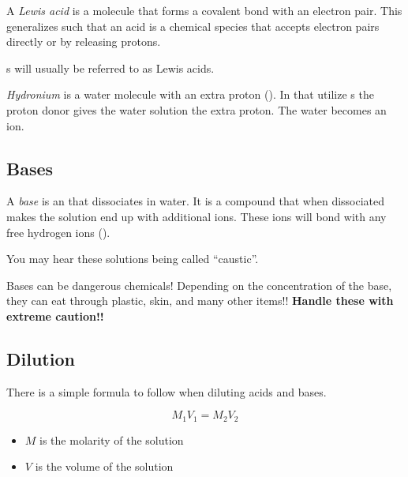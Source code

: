 \begin{definition} \label{def:Lewis Acid}
  A \emph{Lewis acid} is a molecule that forms a covalent bond with an electron pair.
  This generalizes such that an acid is a chemical species that accepts electron pairs directly or by releasing protons.
  
  \begin{remark}
    s will usually be referred to as Lewis acids.
  \end{remark}
\end{definition}

\begin{definition}[Hydronium] \label{def:Hydronium}
  \emph{Hydronium} is a water molecule with an extra proton ().
  In  that utilize s the proton donor gives the water solution the extra proton.
  The water becomes an  ion.
\end{definition}

\subsection{Bases} \label{subsec:Bases}
\begin{definition}[Base] \label{def:Base}
  A \emph{base} is an  that dissociates in water.
  It is a compound that when dissociated makes the solution end up with additional  ions.
  These ions will bond with any free hydrogen ions ().
  
  \begin{remark}
    You may hear these solutions being called ``caustic''.
  \end{remark}

  \begin{remark}
    Bases can be dangerous chemicals!
    Depending on the concentration of the base, they can eat through plastic, skin, and many other items!!
    \textbf{Handle these with extreme caution!!}
  \end{remark}
\end{definition}

\subsection{Dilution} \label{subsec:Dilution}
There is a simple formula to follow when diluting acids and bases.

\begin{equation} \label{eq:Dilution}
  M_{1} V_{1} = M_{2} V_{2}
\end{equation}

\begin{itemize}[noitemsep, nolistsep]
  \item $M$ is the molarity of the solution
  \item $V$ is the volume of the solution
\end{itemize}
